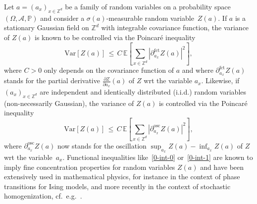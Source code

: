 \documentclass[AHL,Unicode,longabstracts]{cedram}
\newcommand{\Z}{\mathbb Z}
\newcommand{\p}{\mathbb{P}}
\newcommand{\E}{\mathbb{E}}
\newcommand{\A}{\mathcal A}
\newcommand{\parfct}[1]{\partial_{#1}^{\operatorname{fct}}}
\newcommand{\osc}{\partial^{\mathrm{osc}}}
\newcommand{\var}[1]{\mathrm{Var}\left[#1\right]}
\begin{document}
Let $a=(a_x)_{x\in \Z^d}$ be a family of random variables on a probability space $(\Omega,\A,\p)$ and consider a $\sigma(a)$-measurable random variable~$Z(a)$. If $a$ is a stationary Gaussian field on $\Z^d$ with integrable covariance function, the variance of $Z(a)$ is known to be controlled via the Poincaré inequality
\begin{equation}\label{0-int-0}
\var{Z(a)} \,\le \,C\,\E\left[{\sum_{x\in \Z^d} |\parfct{a_x} Z(a)|^2}\right],
\end{equation}
where $C>0$ only depends on the covariance function of $a$ and where $\parfct{a_x} Z(a)$ stands for the partial derivative $\frac{\partial Z}{\partial a_x}(a)$ of $Z$ wrt the variable $a_x$. Likewise, if $(a_x)_{x\in \Z^d}$ are independent and identically distributed (i.i.d.) random variables (non-necessarily Gaussian), the variance of $Z(a)$ is controlled via the Poincaré inequality
\begin{equation}\label{0-int-1}
\var{Z(a)} \,\le \,C\,\E\left[{ \sum_{x\in \Z^d} |\osc_{a_x} Z(a)|^2}\right],
\end{equation}
where $\osc_{a_x} Z(a)$ now stands for the oscillation $\sup_{a_x} Z(a)-\inf_{a_x} Z(a)$ of $Z$ wrt the variable~$a_x$. Functional inequalities like~\eqref{0-int-0} or~\eqref{0-int-1} are known to imply fine concentration properties for random variables $Z(a)$ and have been extensively used in mathematical physics, for instance in the context of phase transitions for Ising models, and more recently in the context of stochastic homogenization, cf.~e.g.~\cite{DGO1,Glotto-Neukamm-14,GNO-I,Glotto-11,Glotto-12,Marahrens-Otto-15,Naddaf-Spencer-98}.

\end{document}
